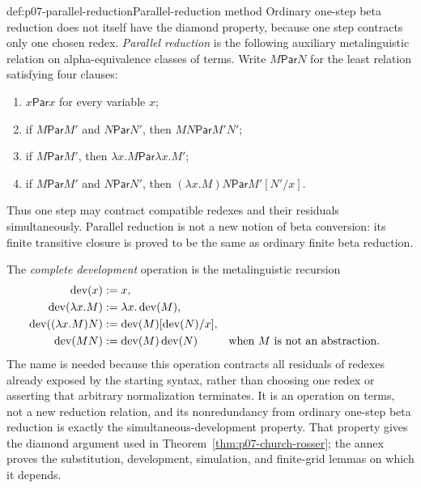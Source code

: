 \begin{hbmethod}{def:p07-parallel-reduction}{Parallel-reduction method}
Ordinary one-step beta reduction does not itself have the diamond property,
because one step contracts only one chosen redex.  \emph{Parallel reduction}
is the following auxiliary metalinguistic relation on alpha-equivalence
classes of terms.  Write \(M\mathrel{\mathsf{Par}}N\) for the least relation
satisfying four clauses:
\begin{enumerate}
  \item \(x\mathrel{\mathsf{Par}}x\) for every variable \(x\);
  \item if \(M\mathrel{\mathsf{Par}}M'\) and
        \(N\mathrel{\mathsf{Par}}N'\), then
        \(MN\mathrel{\mathsf{Par}}M'N'\);
  \item if \(M\mathrel{\mathsf{Par}}M'\), then
        \(\lambda x.M\mathrel{\mathsf{Par}}\lambda x.M'\);
  \item if \(M\mathrel{\mathsf{Par}}M'\) and
        \(N\mathrel{\mathsf{Par}}N'\), then
        \((\lambda x.M)N\mathrel{\mathsf{Par}}M'[N'/x]\).
\end{enumerate}
Thus one step may contract compatible redexes and their residuals
simultaneously.  Parallel reduction is not a new notion of beta conversion:
its finite transitive closure is proved to be the same as ordinary finite
beta reduction.

The \emph{complete development} operation is the metalinguistic recursion
\[
\begin{aligned}
 \operatorname{dev}(x)&\mathrel{:=} x,\\
 \operatorname{dev}(\lambda x.M)&\mathrel{:=}
   \lambda x.\operatorname{dev}(M),\\
 \operatorname{dev}((\lambda x.M)N)&\mathrel{:=}
   \operatorname{dev}(M)[\operatorname{dev}(N)/x],\\
 \operatorname{dev}(MN)&\mathrel{:=}
   \operatorname{dev}(M)\operatorname{dev}(N)
   &&\text{when \(M\) is not an abstraction.}
\end{aligned}
\]
The name is needed because this operation contracts all residuals of redexes
already exposed by the starting syntax, rather than choosing one redex or
asserting that arbitrary normalization terminates.  It is an operation on
terms, not a new reduction relation, and its nonredundancy from ordinary
one-step beta reduction is exactly the simultaneous-development property.
That property gives the diamond argument used in
Theorem~\ref{thm:p07-church-rosser}; the annex proves the substitution,
development, simulation, and finite-grid lemmas on which it depends.
\end{hbmethod}

